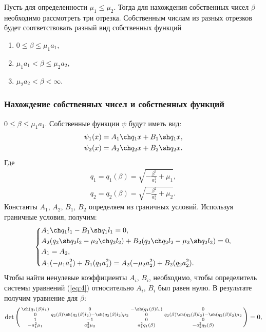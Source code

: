 \documentclass[12pt, a4paper]{article}
\begin{document}
Пусть для определенности $\mu_1 \le \mu_2$. Тогда для нахождения собственных чисел $\beta$ необходимо рассмотреть три отрезка. Собственным числам из разных отрезков будет соответствовать разный вид собственных функций
\begin{enumerate}
  \item $ 0 \le \beta \le \mu_1a_1, $
  \item $ \mu_1a_1 < \beta \le \mu_2a_2, $
  \item $ \mu_2a_2 < \beta < \infty. $
\end{enumerate}
\subsubsection{Нахождение собственных чисел и собственных функций}
 $ 0 \le \beta \le \mu_1a_1$. Собственные функции $\psi$ будут иметь вид:
\begin{equation}
  \begin{aligned}
    \psi_1(x) = A_1 \ch q_1x + B_1 \sh q_1x, \\
    \psi_2(x) = A_2 \ch q_2x + B_2 \sh q_2x.
  \end{aligned}
  \label{eq:5}
\end{equation}
Где 
\begin{equation}
  \begin{aligned}
    q_1 = q_1(\beta) = \sqrt{- \frac{\beta^2}{a_1^2} + \mu_1}, \\
    q_2 = q_2(\beta) = \sqrt{- \frac{\beta^2}{a_2^2} + \mu_2}.
  \end{aligned}
\end{equation}
Константы $A_1$, $A_2$, $B_1$, $B_2$ определяем из граничных условий. Используя граничные условия, получим:
\begin{equation}
  \left\{  
  \begin{aligned}
    & A_1 \ch q_1l_1 - B_1 \sh q_1l_1 = 0, \\
    & A_2 (q_2\sh q_2l_2 - \mu_2\ch q_2l_2) + B_2 (q_2\ch q_2l_2 - \mu_2\sh q_2l_2) = 0, \\
    & A_1 = A_2, \\
    & A_1 (-\mu_1a_1^2) + B_1 (q_1a_1^2) = A_2 (-\mu_2a_2^2) + B_2 (q_2a_2^2).
  \end{aligned}
  \right.
  \label{eq:4}
\end{equation}
Чтобы найти ненулевые коэффициенты $A_i$, $B_i$, необходимо, чтобы определитель системы уравнений (\ref{eq:4}) относительно $A_i$, $B_i$ был равен нулю. В результате получим уравнение для $\beta$:
\begin{equation}
  \det \left(  
  \begin{smallmatrix}
    \ch(q_1(\beta) l_1) & 0 & -\sh(q_1(\beta) l_1) & 0 \\
    0 & q_2(\beta) \sh(q_2(\beta) l_2)-\ch(q_2(\beta) l_2) \mu_2 & 0 & q_2(\beta) \ch(q_2(\beta) l_2)-\sh(q_2(\beta) l_2) \mu_2 \\
    1 & -1 & 0 & 0 \\
    -a_1^2 \mu_1 & a_2^2 \mu_2 & a_1^2 q_1(\beta) & -a_2^2 q_2(\beta) \\
  \end{smallmatrix}
  \right) = 0,
\end{equation}
\end{document}
